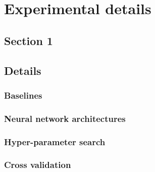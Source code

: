 \ifpdf
    \graphicspath{{Appendix1/Figs/Raster/}{Appendix1/Figs/PDF/}{Appendix1/Figs/}}
\else
    \graphicspath{{Appendix1/Figs/Vector/}{Appendix1/Figs/}}
\fi

\chapter{Experimental details} 


\section{Section 1}


\section{Details} %
\label{sec:details}



\subsection{Baselines} %
\label{sub:baselines}





\subsection{Neural network architectures} %
\label{sub:neural_network_architectures}





\subsection{Hyper-parameter search} %
\label{sub:hyper_parameter_search}






\subsection{Cross validation} %
\label{sub:cross_validation}








